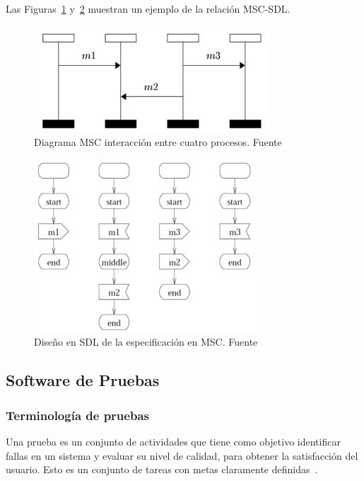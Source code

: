 Las Figuras~\ref{fig:DiagramaMSC} y~\ref{fig:trasl_SDL} muestran un ejemplo de la relaci\'on MSC-SDL.

\begin{figure}[!h]
  \centering
  \includegraphics[scale=0.7]{./images/DiagramaMSC.jpg}
  \caption{Diagrama MSC interacci\'on entre cuatro procesos. Fuente~\cite{Reiners} }
  \label{fig:DiagramaMSC}
\end{figure}

\begin{figure}[H]
  \centering
  \includegraphics[scale=0.7]{./images/trasl_SDL.jpg}
  \caption{Dise\~no en SDL de la especificaci\'on en MSC. Fuente~\cite{Reiners} }
  \label{fig:trasl_SDL}
\end{figure}



\subsection{Software de Pruebas}
\subsubsection{Terminolog\'ia de pruebas}

Una prueba es un conjunto de actividades que tiene como objetivo identificar 
fallas en un sistema y evaluar su nivel de calidad, para obtener la 
satisfacci\'on del usuario. Esto es un conjunto de tareas con metas claramente 
definidas~\cite{Homes2013}.

